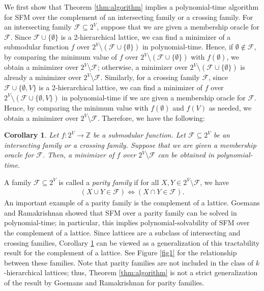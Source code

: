 \documentclass[11pt,letterpaper]{article}
\theoremstyle{plain}
\newtheorem{corollary}[theorem]{Corollary}
\theoremstyle{definition}
\begin{document}
We first show that Theorem \ref{thm:algorithm} implies a polynomial-time algorithm for SFM over the complement of an intersecting family or a crossing family.
For an intersecting family $\mathcal{F}\subseteq 2^V$, suppose that we are given a membership oracle for $\mathcal{F}$.
Since $\mathcal{F}\cup \{\emptyset\}$ is a 2-hierarchical lattice, we can find a minimizer of a submodular function $f$ over $2^V\setminus (\mathcal{F}\cup \{\emptyset\})$ in polynomial-time.
Hence, if $\emptyset\notin \mathcal{F}$, by comparing the minimum value of $f$ over $2^V\setminus (\mathcal{F}\cup \{\emptyset\})$ with $f(\emptyset)$, we obtain a minimizer over $2^V\setminus \mathcal{F}$; otherwise, a minimizer over $2^V\setminus (\mathcal{F}\cup \{\emptyset\})$ is already a minimizer over $2^V\setminus \mathcal{F}$.
Similarly, for a crossing family $\mathcal{F}$, since $\mathcal{F}\cup \{\emptyset, V\}$ is a 2-hierarchical lattice, we can find a minimizer of $f$ over $2^V\setminus (\mathcal{F}\cup \{\emptyset, V\})$ in polynomial-time if we are given a membership oracle for $\mathcal{F}$.
Hence, by comparing the minimum value with $f(\emptyset)$ and $f(V)$ as needed, we obtain a minimizer over $2^V\setminus \mathcal{F}$.
Therefore, we have the following:

\begin{corollary}
\label{cor:intersecting_crossing}
Let $f:2^V\to \mathbb{Z}$ be a submodular function.
Let $\mathcal{F}\subseteq 2^V$ be an intersecting family or a crossing family.
Suppose that we are given a membership oracle for $\mathcal{F}$.
Then, a minimizer of $f$ over $2^V\setminus \mathcal{F}$ can be obtained in polynomial-time.
\end{corollary}

A family $\mathcal{F}\subseteq 2^V$ is called a \textit{parity family} if for all $X,Y\in 2^V\setminus \mathcal{F}$, we have
\begin{align*}
(X\cup Y\in \mathcal{F}) \iff (X\cap Y\in \mathcal{F}).
\end{align*}
An important example of a parity family is the complement of a lattice.
Goemans and Ramakrishnan \cite{goemans1995} showed that SFM over a parity family can be solved in polynomial-time; in particular, this implies polynomial-solvability of SFM over the complement of a lattice.
Since lattices are a subclass of intersecting and crossing families, Corollary \ref{cor:intersecting_crossing} can be viewed as a generalization of this tractability result for the complement of a lattice.
See Figure \ref{fig1} for the relationship between these families.
Note that parity families are not included in the class of $k$-hierarchical lattices; thus, Theorem \ref{thm:algorithm} is not a strict generalization of the result by Goemans and Ramakrishnan for parity families.
\end{document}
